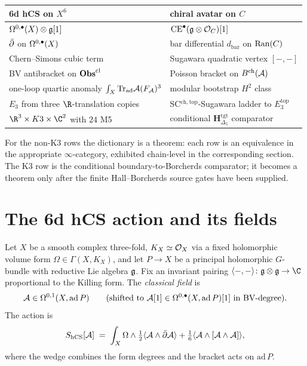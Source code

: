 {\small
\begin{center}
\begin{tabular}{ll}
 \toprule
 6d hCS on $X^6$ & chiral avatar on $C$ \\
 \midrule
 $\Omega^{0,\bullet}(X)\otimes\mathfrak{g}[1]$ & $\mathrm{CE}^\bullet(\mathfrak{g}\otimes\mathcal{O}_C)[1]$ \\
 $\bar\partial$ on $\Omega^{0,\bullet}(X)$ & bar differential $d_{\mathrm{bar}}$ on $\mathrm{Ran}(C)$ \\
 Chern--Simons cubic term & Sugawara quadratic vertex $[-,-]$ \\
 BV antibracket on $\mathbf{Obs}^{\mathrm{cl}}$ & Poisson bracket on $B^{\mathrm{ch}}(\mathcal{A})$ \\
 one-loop quartic anomaly $\int_X\mathrm{Tr}_{\mathrm{ad}}\mathcal{A}(F_{\mathcal{A}})^3$ & modular bootstrap $H^2$ class \\
 $E_3$ from three $\R$-translation copies & SC$^{\mathrm{ch,top}}$-Sugawara ladder to $E_3^{\mathrm{top}}$ \\
 $\R^3\times K3\times\C^2$ with $24$ M5 & conditional $\mathbf{H}_{\Delta_5}^{\mathrm{tgt}}$ comparator\\
 \bottomrule
\end{tabular}
\end{center}
}

For the non-K3 rows the dictionary is a theorem: each
row is an equivalence in the appropriate $\infty$-category, exhibited
chain-level in the corresponding section. The K3 row is the
conditional boundary-to-Borcherds comparator; it becomes a theorem only
after the finite Hall--Borcherds source gates have been supplied.

\section{The 6d hCS action and its fields}
\label{sec:hcs-action-fields}

\begin{definition}
\label{def:hcs-fields}
%
Let $X$ be a smooth complex three-fold, $K_X\simeq\mathcal{O}_X$ via a fixed
holomorphic volume form $\Omega\in\Gamma(X,K_X)$, and let
$P\to X$ be a principal holomorphic $G$-bundle with reductive Lie
algebra $\mathfrak{g}$. Fix an invariant pairing
$\langle-,-\rangle\colon\fg\otimes\fg\to\C$ proportional to the Killing
form. The \emph{classical field} is
\[
 \mathcal{A} \in \Omega^{0,1}(X,\mathrm{ad}\,P)
 \qquad\text{(shifted to }
 \mathcal{A}[1] \in \Omega^{0,\bullet}(X,\mathrm{ad}\,P)[1]\text{ in BV-degree)}.
\]
The action is
\begin{equation}
\label{eq:hcs-action}
 S_{\mathrm{hCS}}[\mathcal{A}] \;=\; \int_X \Omega\wedge
 \tfrac{1}{2}\langle\mathcal{A}\wedge\bar\partial\mathcal{A}\rangle
 + \tfrac{1}{6}\langle\mathcal{A}\wedge[\mathcal{A}\wedge\mathcal{A}]\rangle,
\end{equation}
where the wedge combines the form degrees and the bracket acts on
$\mathrm{ad}\,P$.
\end{definition}

